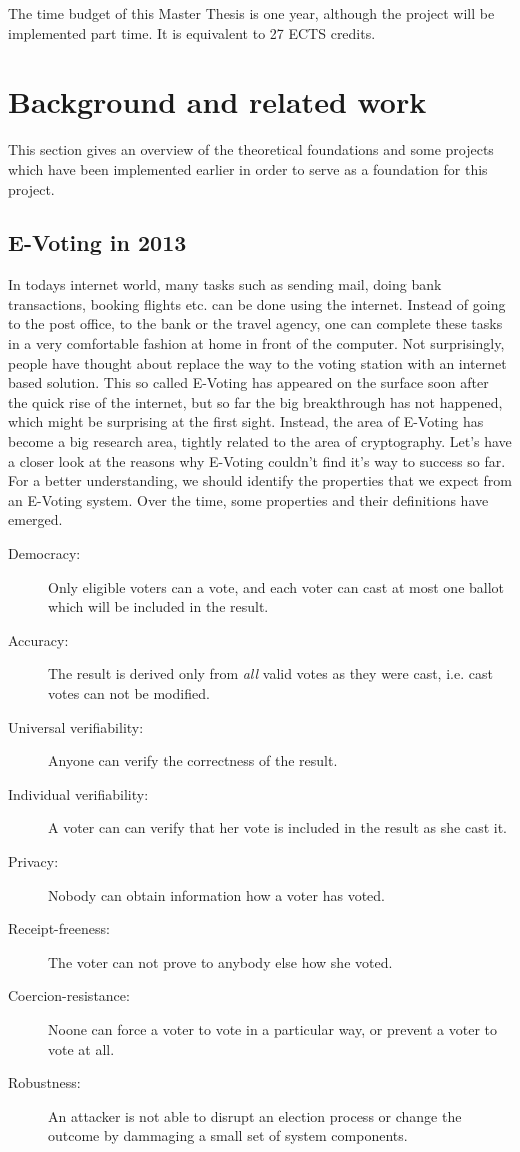 \documentclass[numbers=noenddot, abstract=on, a4paper, headsepline,
footsepline, oneside, draft=off]{scrreprt}
\begin{document}
The time budget of this Master Thesis is one year, although the project will be
implemented part time. It is equivalent to 27 ECTS credits. 

\chapter{Background and related work}
\label{cha:brw}
This section gives an overview of the theoretical foundations and some projects
which have been implemented earlier in order to serve as a foundation for this
project.

\section{E-Voting in 2013}
\label{sec:evoting}
In todays internet world, many tasks such as sending mail, doing bank
transactions, booking flights etc. can be done using the internet. Instead of
going to the post office, to the bank or the travel agency, one can complete
these tasks in a very comfortable fashion at home in front of the computer. Not
surprisingly, people have thought about replace the way to the voting station
with an internet based solution. This so called E-Voting has appeared on the
surface soon after the quick rise of the internet, but so far the big
breakthrough has not happened, which might be surprising at the first sight.
Instead, the area of E-Voting has become a big research area, tightly related to
the area of cryptography. Let's have a closer look at the reasons why E-Voting
couldn't find it's way to success so far. For a better understanding, we should
identify the properties that we expect from an E-Voting system. Over the time,
some properties and their definitions have emerged.

\begin{description}
  \item[Democracy:] Only eligible voters can a vote, and each voter can
  cast at most one ballot which will be included in the result.
  \item[Accuracy:] The result is derived only from \emph{all} valid
  votes as they were cast, i.e. cast votes can not be modified.
  \item[Universal verifiability:] Anyone can verify the correctness of
  the result.
  \item[Individual verifiability:] A voter can can verify that her vote
  is included in the result as she cast it.
  \item[Privacy:] Nobody can obtain information how a voter has
  voted.
  \item[Receipt-freeness:] The voter can not prove to anybody else how
  she voted.
  \item[Coercion-resistance:] Noone can force a voter to vote in a
  particular way, or prevent a voter to vote at all.
  \item[Robustness:] An attacker is not able to disrupt an election
  process or change the outcome by dammaging a small set of system components. 
\end{description}
\end{document}

